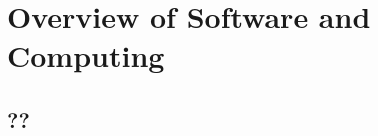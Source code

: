 \chapter{Overview of Software and Computing}
\label{ch:sw-comp-ov}


\section{??}
\label{sec:sw-comp-ov-??}



